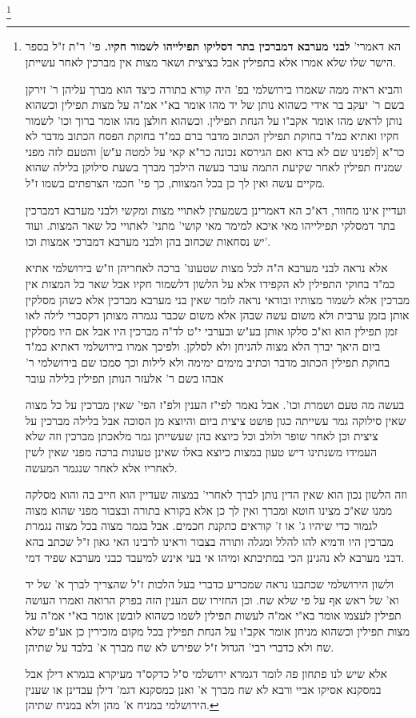 \documentclass[12pt, openany]{book}
\newcommand{\footnotecomment}[1]{\footnote{#1}}
\newcommand{\commenta}[1]{\footnotecomment{#1}}
\begin{document}
{\commenta{ הא דאמרי' \textbf{לבני מערבא דמברכין בתר דסליקו תפילייהו לשמור חקיו.}  פי' ר"ת ז"ל בספר הישר שלו שלא אמרו אלא בתפילין אבל בציצית ושאר מצות אין מברכין לאחר עשייתן.\par  והביא ראיה ממה שאמרו בירושלמי בפ' היה קורא בתורה כיצד הוא מברך עליהן ר' זירקן בשם ר' יעקב בר אידי כשהוא נותן של יד מהו אומר בא"י אמ"ה על מצות תפילין וכשהוא נותן לראש מהו אומר אקב"ו על הנחת תפילין. וכשהוא חולצן מהו אומר ברוך וכו' לשמור חקיו ואתיא כמ"ד בחוקת תפילין הכתוב מדבר ברם כמ"ד בחוקת הפסח הכתוב מדבר לא כר"א [{\small לפנינו שם }  לא בדא {\small ואם הגירסא נכונה }  כר"א קאי על למטה ע"ש] והטעם לזה מפני שמניח תפילין לאחר שקיעת התמה עובר בעשה הילכך מברך בשעת סילוקן בלילה שהוא מקיים עשה ואין לך כן בכל המצוות, כך פי' חכמי הצרפתים בשמו ז"ל.\par ועדיין אינו מחוור, דא"כ הא דאמרינן בשמעתין לאתויי מצות ומקשי ולבני מערבא דמברכין בתר דמסלקי תפילייהו מאי איכא למימר מאי קושי' מתני' לאתויי כל שאר המצות. ועוד יש נסחאות שכחוב בהן ולבני מערבא דמברכי אמצות וכו'.\par  אלא נראה לבני מערבא ה"ה לכל מצות שטעונו' ברכה לאחריהן וז"ש בירושלמי אתיא כמ"ד בחוקי התפילין לא הקפידו אלא על הלשון דלשמור חקיו אבל שאר כל המצות אין מברכין אלא לשמור מצותיו ובודאי נראה לומר שאין בני מערבא מברכין אלא כשהן מסלקין אותן בזמן ערבית ולא משום עשה שבהן אלא משום שכבר נגמרה מצותן דקסברי לילה לאו זמן תפילין הוא וא"כ סלקו אותן בע"ש ובערבי י"ט לד"ה מברכין היו אבל אם היו מסלקין ביום היאך יברך הלא מצוה להניחן ולא לסלקן. ולפיכך אמרו בירושלמי דאתיא כמ"ד בחוקת תפילין הכתוב מדבר וכתיב מימים ימימה ולא לילות וכך סמכו שם בירושלמי ר' אבהו בשם ר' אלעזר הנותן תפילין בלילה עובר\par בעשה מה טעם ושמרת וכו'. אבל נאמר לפי"ז הענין ולפ"ז הפי' שאין מברכין על כל מצוה שאין סילוקה גמר עשייתה כגון פושט ציצית ביום והיוצא מן הסוכה אבל בלילה מברכין על ציצית וכן לאחר שופר ולולב וכל כיוצא בהן שעשייתן גמר מלאכתן מברכין וזה שלא העמידו משנתינו דיש טעון במצות כיוצא באלו שאינן טעונות ברכה מפני שאין לשין לאחריו אלא לאחר שנגמר המעשה.\par וזה הלשון נכון הוא שאין הדין נותן לברך לאחרי' במצוה שעדיין הוא חייב בה והוא מסלקה ממנו שא"כ מצינו חוטא ומברך ואין לך כן אלא בקורא בתורה ובצבור מפני שהוא מצוה לגמור כדי שיהיו ג' או ז' קוראים כתקנת חכמים. אבל בגמר מצוה בכל מצוה נגמרת מברכין היו ודמיא להו להלל ומגלה ותורה בצבור וראינו לרבינו האי גאון ז"ל שכתב בהא דבני מערבא לא נהגינן הכי במתיבתא ומיהו אי בעי אינש למיעבד כבני מערבא שפיר דמי.\par ולשון הירושלמי שכתבנו נראה שמכריע כדברי בעל הלכות ז"ל שהצריך לברך א' של יד וא' של ראש אף על פי שלא שח. וכן החזירו שם הענין הזה בפרק הרואה ואמרו העושה תפילין לעצמו אומר בא"י אמ"ה לעשות תפילין לשמו כשהוא לובשן אומר בא"י אמ"ה על מצות תפילין וכשהוא מניחן אומר אקב"ו על הנחת תפילין בכל מקום מזכירין כן אע"פ שלא שח ולא כדברי רבי' הגדול ז"ל שפירש לא שח מברך א' בלבד על שתיהן.\par  אלא שיש לנו פתחון פה לומר דגמרא ירושלמי ס"ל כדקס"ד מעיקרא בגמרא דילן אבל במסקנא אסיקו אביי ורבא לא שח מברך א' ואנן כמסקנא דגמ' דילן עבדינן או שענין הירושלמי במניח א' מהן ולא במניח שתיהן. }

}
\end{document}
